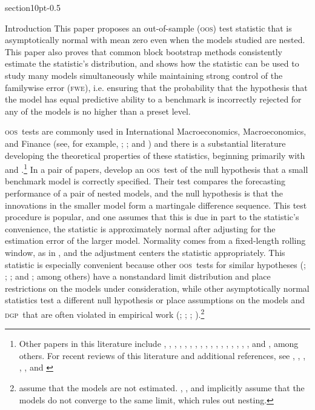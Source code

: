 \documentclass[11pt,fleqn]{article}
\makeatletter
\renewcommand\section{\@startsection%
{section}{1}{0pt}{-\baselineskip}{0.5\baselineskip}%
{\normalfont\normalsize\bfseries\large\raggedright}}
\theoremstyle{definition}
\newcommand{\dgp}{\textsc{dgp}}
\newcommand{\fwe}{\textsc{fwe}}
\newcommand{\oos}{\textsc{oos}}
\makeatother
\begin{document}
\section{Introduction} This paper proposes an out-of-sample (\oos)
test statistic that is asymptotically normal with mean zero even when
the models studied are nested.  This paper also proves that common
block bootstrap methods consistently estimate the statistic's
distribution, and shows how the statistic can be used to study many
models simultaneously while maintaining strong control of the
familywise error (\fwe), i.e. ensuring that the probability that the
hypothesis that the model has equal predictive ability to a benchmark
is incorrectly rejected for any of the models is no higher than a
preset level.

\oos\ tests are commonly used in International Macroeconomics,
Macroeconomics, and Finance (see, for example, \citealt{MeR:83};
\citealt{StW:03}; and \citealt{GoW:08}) and there is a substantial
literature developing the theoretical properties of these statistics,
beginning primarily with \citet{DiM:95} and
\citet{Wes:96}.\footnote{Other papers in this literature include
  \citet{WeM:98}, \citet{Mcc:98,Mcc:00},
  \citet{ClM:01,ClM:05-2,ClM:05,ClM:11b,ClM:12,ClM:12b},
  \citet{CCS:01}, \citet{CoS:02,CoS:04,CoS:07}, \citet{Whi:00},
  \citet{InK:04,InK:06}, \citet{Han:05}, \citet{Ros:05},
  \citet{ClW:06,ClW:07}, \citet{Ana:07}, \citet{GiR:09,GiR:10},
  \citet{HuW:10}, \citet{HLN:11}, \cite{InR:11}, \cite{Pin:11},
  \cite{RoS:11,RoS:11b}, and \citet{Cal:11}, among others.  For recent
  reviews of this literature and additional references, see
  \citet{McW:02}, \citet{CoS:06}, \citet{Wes:06}, \citet{ClM:11c},
  \citet{CoD:11}, and \citet{Gia:11}} In a pair of papers,
\citet{ClW:06,ClW:07} develop an \oos\ test of the null hypothesis
that a small benchmark model is correctly specified.  Their test
compares the forecasting performance of a pair of nested models, and
the null hypothesis is that the innovations in the smaller model form
a martingale difference sequence.  This test procedure is popular, and
one assumes that this is due in part to the statistic's convenience,
the statistic is approximately normal after adjusting for the
estimation error of the larger model.  Normality comes from a
fixed-length rolling window, as in \citet{GiW:06}, and the adjustment
centers the statistic appropriately.  This statistic is especially
convenient because other \oos\ tests for similar hypotheses
(\citealt{CCS:01}; \citealt{ClM:01,ClM:05}; \citealt{CoS:02,CoS:04};
and \citealt{Mcc:07}; among others) have a nonstandard limit
distribution and place restrictions on the models under consideration,
while other asymptotically normal statistics test a different null
hypothesis \citep{GiW:06} or place assumptions on the models and \dgp\
that are often violated in empirical work (\citealt{DiM:95};
\citealt{Wes:96}; \citealt{WeM:98};
\citealt{Mcc:00}).\footnote{\citet{DiM:95} assume that the models are
  not estimated. \citet{Wes:96}, \citet{WeM:98}, and \citet{Mcc:00}
  implicitly assume that the models do not converge to the same limit,
  which rules out nesting.}
\end{document}
